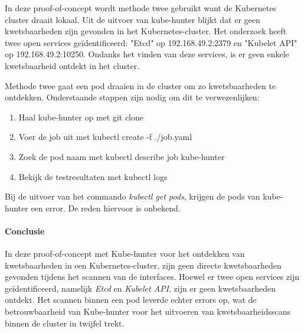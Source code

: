 In deze proof-of-concept wordt methode twee gebruikt want de Kubernetes cluster draait lokaal. 
Uit de uitvoer van kube-hunter blijkt dat er geen kwetsbaarheden zijn gevonden in het Kubernetes-cluster. Het onderzoek heeft twee open services geïdentificeerd: "Etcd" op 192.168.49.2:2379 en "Kubelet API" op 192.168.49.2:10250. Ondanks het vinden van deze services, is er geen enkele kwetsbaarheid ontdekt in het cluster.

Methode twee gaat een pod draaien in de cluster om zo kwetsbaarheden te ontdekken. Onderstaande stappen zijn nodig om dit te verwezenlijken:
\begin{enumerate}
    \item Haal kube-hunter op met git clone
    \item Voer de job uit met kubectl create -f ./job.yaml
    \item Zoek de pod naam met kubectl describe job kube-hunter
    \item Bekijk de testresultaten met kubectl logs
\end{enumerate} 

Bij de uitvoer van het commando \textit{kubectl get pods}, krijgen de pods van kube-hunter een error. De reden hiervoor is onbekend.

\paragraph{Conclusie}
In deze proof-of-concept met Kube-hunter voor het ontdekken van kwetsbaarheden in een Kubernetes-cluster, zijn geen directe kwetsbaarheden gevonden tijdens het scannen van de interfaces. Hoewel er twee open services zijn geïdentificeerd, namelijk \textit{Etcd} en \textit{Kubelet API}, zijn er geen kwetsbaarheden ontdekt. Het scannen binnen een pod leverde echter errors op, wat de betrouwbaarheid van Kube-hunter voor het uitvoeren van kwetsbaarheidsscans binnen de cluster in twijfel trekt.
